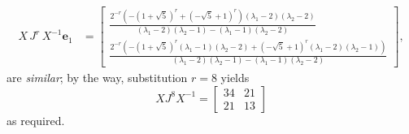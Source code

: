 \begin{example}
\begin{displaymath}
\begin{split}
X\,J^{r}\,X^{-1}\boldsymbol{e}_{1}  &= \left[\begin{matrix}\frac{2^{- r} \left(- \left(1 + \sqrt{5}\right)^{r} + \left(- \sqrt{5} + 1\right)^{r}\right) \left(\lambda_{1} - 2\right) \left(\lambda_{2} - 2\right)}{\left(\lambda_{1} - 2\right) \left(\lambda_{2} - 1\right) - \left(\lambda_{1} - 1\right) \left(\lambda_{2} - 2\right)}\\\frac{2^{- r} \left(- \left(1 + \sqrt{5}\right)^{r} \left(\lambda_{1} - 1\right) \left(\lambda_{2} - 2\right) + \left(- \sqrt{5} + 1\right)^{r} \left(\lambda_{1} - 2\right) \left(\lambda_{2} - 1\right)\right)}{\left(\lambda_{1} - 2\right) \left(\lambda_{2} - 1\right) - \left(\lambda_{1} - 1\right) \left(\lambda_{2} - 2\right)}\end{matrix}\right],
\end{split}
\end{displaymath}
are \textit{similar}; by the way, substitution $r=8$ yields
\begin{displaymath}
X J^{8} X^{-1} = \left[\begin{matrix}34 & 21\\21 & 13\end{matrix}\right]
\end{displaymath}
as required.
\end{example}
